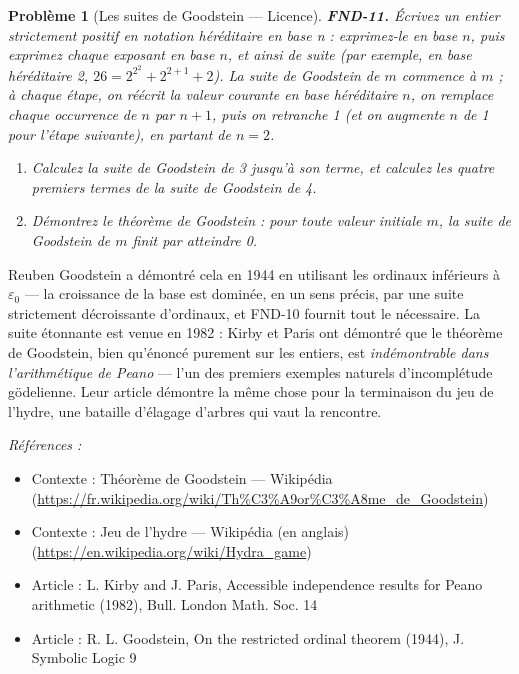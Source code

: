\documentclass[11pt]{article}
\newtheorem{problem}{Problème}
\newenvironment{refs}{\par\small\noindent\emph{Références :}\begin{itemize}\setlength\itemsep{0pt}}{\end{itemize}\normalsize}
\begin{document}
\bigskip

\begin{problem}[{Les suites de Goodstein --- Licence}]
\textbf{FND-11.} Écrivez un entier strictement positif en \textit{notation héréditaire en base
n} : exprimez-le en base $ n $, puis exprimez chaque exposant en base $ n $, et ainsi de
suite (par exemple, en base héréditaire 2, $ 26 = 2^{2^2} + 2^{2+1} + 2 $). La suite de
Goodstein de $ m $ commence à $ m $ ; à chaque étape, on réécrit la valeur courante en base
héréditaire $ n $, on remplace chaque occurrence de $ n $ par $ n+1 $, puis on retranche 1
(et on augmente $ n $ de 1 pour l'étape suivante), en partant de $ n = 2 $.
\begin{enumerate}
\item[(a)] Calculez la suite de Goodstein de 3 jusqu'à
son terme, et calculez les quatre premiers termes de la suite de Goodstein de 4.
\item[(b)] Démontrez le
théorème de Goodstein : pour toute valeur initiale $ m $, la suite de Goodstein de $ m $
finit par atteindre 0.
\end{enumerate}

\end{problem}

\noindent Reuben Goodstein a démontré cela en 1944 en utilisant les ordinaux inférieurs à
$ \varepsilon_0 $ --- la croissance de la base est dominée, en un sens précis, par une suite
strictement décroissante d'ordinaux, et FND-10 fournit tout le nécessaire. La suite étonnante est
venue en 1982 : Kirby et Paris ont démontré que le théorème de Goodstein, bien qu'énoncé purement
sur les entiers, est \textit{indémontrable dans l'arithmétique de Peano} --- l'un des premiers exemples
naturels d'incomplétude gödelienne. Leur article démontre la même chose pour la terminaison du jeu
de l'hydre, une bataille d'élagage d'arbres qui vaut la rencontre.

\begin{refs}
\item Contexte : Théorème de Goodstein --- Wikipédia (\url{https://fr.wikipedia.org/wiki/Th%C3%A9or%C3%A8me_de_Goodstein})
\item Contexte : Jeu de l'hydre --- Wikipédia (en anglais) (\url{https://en.wikipedia.org/wiki/Hydra_game})
\item Article : L. Kirby and J. Paris, \og{} Accessible independence results for Peano arithmetic \fg{} (1982), Bull. London Math. Soc. 14
\item Article : R. L. Goodstein, \og{} On the restricted ordinal theorem \fg{} (1944), J. Symbolic Logic 9
\end{refs}
\end{document}
